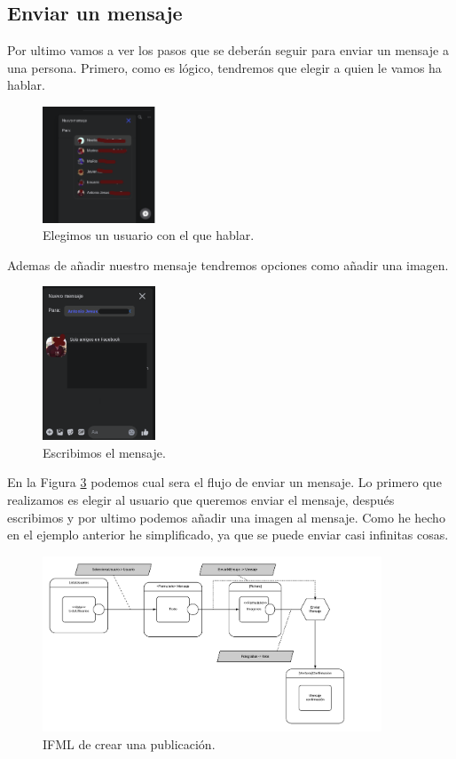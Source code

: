 \documentclass[12pt,a4paper]{article}
\begin{document}
\subsection{Enviar un mensaje}
Por ultimo vamos a ver los pasos que se deberán seguir para enviar un mensaje a una persona. Primero, como es lógico, tendremos que elegir a quien le vamos ha hablar. 
\begin{figure}[H]
	\centering
	\includegraphics[width=0.3\textwidth]{images/capturas/elegirMensajero.png}
	\caption{Elegimos un usuario con el que hablar. }
	\label{fig:mensajero}	
\end{figure}
Ademas de añadir nuestro mensaje tendremos opciones como añadir una imagen.
\begin{figure}[H]
	\centering
	\includegraphics[width=0.3\textwidth]{images/capturas/escribirMensaje.png}
	\caption{Escribimos el mensaje.}
	\label{fig:mensaje}	
\end{figure}
En la Figura \ref{fig:ifmlmensaje} podemos cual sera el flujo de enviar un mensaje. Lo primero que realizamos es elegir al usuario que queremos enviar el mensaje, después escribimos y por ultimo podemos añadir una imagen al mensaje. Como he hecho en el ejemplo anterior he simplificado, ya que se puede enviar casi infinitas cosas. 
\begin{figure}[H]
	\centering
	\includegraphics[width=0.9\textwidth]{images/ifml/enviarMensaje.png}
	\caption{IFML de crear una publicación. }
	\label{fig:ifmlmensaje}	
\end{figure}
\end{document}
